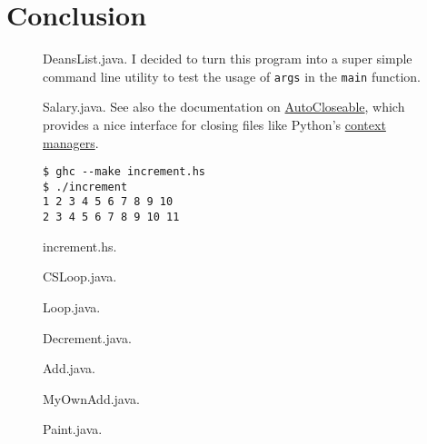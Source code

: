 \documentclass[leqno, 11pt]{article}
\begin{document}
\section*{Conclusion}
\newpage
\begin{figure}
  \centering
  
  \caption{DeansList.java. I decided to turn this program into a super simple command line utility to test the usage of \texttt{args} in the \texttt{main} function.}
  \label{fig:one}
\end{figure}
\begin{figure}
  \centering
  
  \caption{Salary.java. See also the documentation on \href{https://docs.oracle.com/javase/10/docs/api/java/lang/AutoCloseable.html}{AutoCloseable}, which provides a nice interface for closing files like Python's \href{https://docs.python.org/3/reference/compound_stmts.html\#with}{context managers}.}
  \label{fig:two}
\end{figure}
\begin{figure}
  \centering
  
  \begin{verbatim}
$ ghc --make increment.hs
$ ./increment
1 2 3 4 5 6 7 8 9 10
2 3 4 5 6 7 8 9 10 11
  \end{verbatim}
  \caption{increment.hs.}
  \label{fig:four}
\end{figure}
\begin{figure}
  \centering
  
  \caption{CSLoop.java.}
  \label{fig:six}
\end{figure}
\begin{figure}
  \centering
  
  \caption{Loop.java.}
  \label{fig:seven}
\end{figure}
\begin{figure}
  \centering
  
  \caption{Decrement.java.}
  \label{fig:eight}
\end{figure}
\begin{figure}
  \centering
  
  \caption{Add.java.}
  \label{fig:nine}
\end{figure}
\begin{figure}
  \centering
  
  \caption{MyOwnAdd.java.}
  \label{fig:ten}
\end{figure}
\begin{figure}
  \centering
  
  \caption{Paint.java.}
  \label{fig:eleven}
\end{figure}
\end{document}
